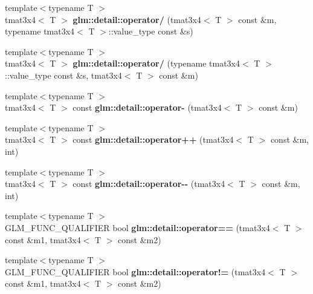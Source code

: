 \begin{DoxyCompactItemize}
\item 
\hypertarget{namespaceglm_1_1detail_ab3e634f606d38c8fd4b26e5dff73a055}{{\footnotesize template$<$typename T $>$ }\\tmat3x4$<$ \-T $>$ {\bfseries glm\-::detail\-::operator/} (tmat3x4$<$ \-T $>$ const \&m, typename tmat3x4$<$ \-T $>$\-::value\-\_\-type const \&s)}\label{namespaceglm_1_1detail_ab3e634f606d38c8fd4b26e5dff73a055}

\item 
\hypertarget{namespaceglm_1_1detail_ae4dfd6819cf6c250ac8b5d79cafdc345}{{\footnotesize template$<$typename T $>$ }\\tmat3x4$<$ \-T $>$ {\bfseries glm\-::detail\-::operator/} (typename tmat3x4$<$ \-T $>$\-::value\-\_\-type const \&s, tmat3x4$<$ \-T $>$ const \&m)}\label{namespaceglm_1_1detail_ae4dfd6819cf6c250ac8b5d79cafdc345}

\item 
\hypertarget{namespaceglm_1_1detail_ab5f9be06d60dc8ca01ef00c962587dd4}{{\footnotesize template$<$typename T $>$ }\\tmat3x4$<$ \-T $>$ const {\bfseries glm\-::detail\-::operator-\/} (tmat3x4$<$ \-T $>$ const \&m)}\label{namespaceglm_1_1detail_ab5f9be06d60dc8ca01ef00c962587dd4}

\item 
\hypertarget{namespaceglm_1_1detail_aa528ae0d61724655b493bfbec36b0c7c}{{\footnotesize template$<$typename T $>$ }\\tmat3x4$<$ \-T $>$ const {\bfseries glm\-::detail\-::operator++} (tmat3x4$<$ \-T $>$ const \&m, int)}\label{namespaceglm_1_1detail_aa528ae0d61724655b493bfbec36b0c7c}

\item 
\hypertarget{namespaceglm_1_1detail_a68114ab026e0d76f0d779a6ea06b0b3a}{{\footnotesize template$<$typename T $>$ }\\tmat3x4$<$ \-T $>$ const {\bfseries glm\-::detail\-::operator-\/-\/} (tmat3x4$<$ \-T $>$ const \&m, int)}\label{namespaceglm_1_1detail_a68114ab026e0d76f0d779a6ea06b0b3a}

\item 
\hypertarget{namespaceglm_1_1detail_ac9dfe3a4276deb126dead3fe196bb81d}{{\footnotesize template$<$typename T $>$ }\\\-G\-L\-M\-\_\-\-F\-U\-N\-C\-\_\-\-Q\-U\-A\-L\-I\-F\-I\-E\-R bool {\bfseries glm\-::detail\-::operator==} (tmat3x4$<$ \-T $>$ const \&m1, tmat3x4$<$ \-T $>$ const \&m2)}\label{namespaceglm_1_1detail_ac9dfe3a4276deb126dead3fe196bb81d}

\item 
\hypertarget{namespaceglm_1_1detail_a06bb5a617c042f5240f6100cedb38cdb}{{\footnotesize template$<$typename T $>$ }\\\-G\-L\-M\-\_\-\-F\-U\-N\-C\-\_\-\-Q\-U\-A\-L\-I\-F\-I\-E\-R bool {\bfseries glm\-::detail\-::operator!=} (tmat3x4$<$ \-T $>$ const \&m1, tmat3x4$<$ \-T $>$ const \&m2)}\label{namespaceglm_1_1detail_a06bb5a617c042f5240f6100cedb38cdb}

\end{DoxyCompactItemize}


